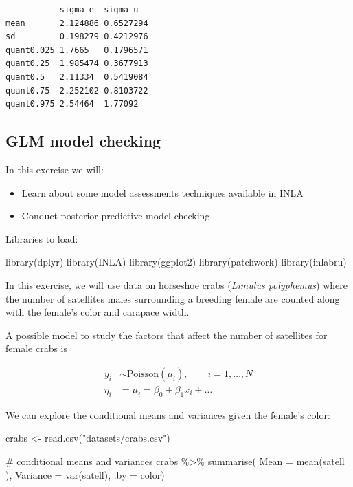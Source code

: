 \documentclass[
  letterpaper,
  DIV=11,
  numbers=noendperiod]{scrartcl}
\newenvironment{Shaded}{\begin{snugshade}}{\end{snugshade}}
\newcommand{\AttributeTok}[1]{\textcolor[rgb]{0.40,0.45,0.13}{#1}}
\newcommand{\CommentTok}[1]{\textcolor[rgb]{0.37,0.37,0.37}{#1}}
\newcommand{\FunctionTok}[1]{\textcolor[rgb]{0.28,0.35,0.67}{#1}}
\newcommand{\NormalTok}[1]{\textcolor[rgb]{0.00,0.23,0.31}{#1}}
\newcommand{\OtherTok}[1]{\textcolor[rgb]{0.00,0.23,0.31}{#1}}
\newcommand{\SpecialCharTok}[1]{\textcolor[rgb]{0.37,0.37,0.37}{#1}}
\newcommand{\StringTok}[1]{\textcolor[rgb]{0.13,0.47,0.30}{#1}}
\providecommand{\tightlist}{%
  \setlength{\itemsep}{0pt}\setlength{\parskip}{0pt}}\usepackage{longtable,booktabs,array}
\begin{document}
\begin{tcolorbox}
\begin{verbatim}
           sigma_e  sigma_u  
mean       2.124886 0.6527294
sd         0.198279 0.4212976
quant0.025 1.7665   0.1796571
quant0.25  1.985474 0.3677913
quant0.5   2.11334  0.5419084
quant0.75  2.252102 0.8103722
quant0.975 2.54464  1.77092  
\end{verbatim}

\end{tcolorbox}

\subsection{GLM model checking}\label{sec-linmodel}

In this exercise we will:

\begin{itemize}
\tightlist
\item
  Learn about some model assessments techniques available in INLA
\item
  Conduct posterior predictive model checking
\end{itemize}

Libraries to load:

\begin{Shaded}
\begin{Highlighting}[]
\FunctionTok{library}\NormalTok{(dplyr)}
\FunctionTok{library}\NormalTok{(INLA)}
\FunctionTok{library}\NormalTok{(ggplot2)}
\FunctionTok{library}\NormalTok{(patchwork)}
\FunctionTok{library}\NormalTok{(inlabru)     }
\end{Highlighting}
\end{Shaded}

In this exercise, we will use data on horseshoe crabs (\emph{Limulus
polyphemus}) where the number of satellites males surrounding a breeding
female are counted along with the female's color and carapace width.

A possible model to study the factors that affect the number of
satellites for female crabs is

\[
\begin{aligned}
y_i&\sim\mathrm{Poisson}(\mu_i), \qquad i = 1,\dots,N \\
\eta_i &= \mu_i = \beta_0 + \beta_1 x_i + \ldots
\end{aligned}
\]

We can explore the conditional means and variances given the female's
color:

\begin{Shaded}
\begin{Highlighting}[]
\NormalTok{crabs }\OtherTok{\textless{}{-}} \FunctionTok{read.csv}\NormalTok{(}\StringTok{"datasets/crabs.csv"}\NormalTok{)}

\CommentTok{\# conditional means and variances}
\NormalTok{crabs }\SpecialCharTok{\%\textgreater{}\%}
  \FunctionTok{summarise}\NormalTok{( }\AttributeTok{Mean =} \FunctionTok{mean}\NormalTok{(satell ),}
             \AttributeTok{Variance =} \FunctionTok{var}\NormalTok{(satell),}
                     \AttributeTok{.by =}\NormalTok{ color)}
\end{Highlighting}
\end{Shaded}
\end{document}
